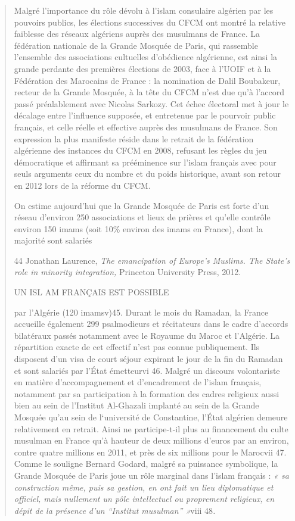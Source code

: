 \begin{quote}
Malgré l'importance du rôle dévolu à l'islam consulaire algérien par les
pouvoirs publics, les élections successives du CFCM ont montré la
relative faiblesse des réseaux algériens auprès des musulmans de France.
La fédération nationale de la Grande Mosquée de Paris, qui rassemble
l'ensemble des associations cultuelles d'obédience algérienne, est ainsi
la grande perdante des premières élections de 2003, face à l'UOIF et à
la Fédération des Marocains de France : la nomination de Dalil
Boubakeur, recteur de la Grande Mosquée, à la tête du CFCM n'est due
qu'à l'accord passé préalablement avec Nicolas Sarkozy. Cet échec
électoral met à jour le décalage entre l'influence supposée, et
entretenue par le pourvoir public français, et celle réelle et effective
auprès des musulmans de France. Son expression la plus manifeste réside
dans le retrait de la fédération algérienne des instances du CFCM en
2008, refusant les règles du jeu démocratique et affirmant sa
prééminence sur l'islam français avec pour seuls arguments ceux du
nombre et du poids historique, avant son retour en 2012 lors de la
réforme du CFCM.

On estime aujourd'hui que la Grande Mosquée de Paris est forte d'un
réseau d'environ 250 associations et lieux de prières et qu'elle
contrôle environ 150 imams (soit 10\% environ des imams en France), dont
la majorité sont salariés

44 Jonathan Laurence, \emph{The emancipation of Europe's Muslims. The
State's role in minority integration,} Princeton University Press, 2012.

UN ISL AM FRANÇAIS EST POSSIBLE

par l'Algérie (120 imamsv)45. Durant le mois du Ramadan, la France
accueille également 299 psalmodieurs et récitateurs dans le cadre
d'accords bilatéraux passés notamment avec le Royaume du Maroc et
l'Algérie. La répartition exacte de cet effectif n'est pas connue
publiquement. Ils disposent d'un visa de court séjour expirant le jour
de la fin du Ramadan et sont salariés par l'État émetteurvi 46. Malgré
un discours volontariste en matière d'accompagnement et d'encadrement de
l'islam français, notamment par sa participation à la formation des
cadres religieux aussi bien au sein de l'Institut Al-Ghazali implanté au
sein de la Grande Mosquée qu'au sein de l`université de Constantine,
l'État algérien demeure relativement en retrait. Ainsi ne participe-t-il
plus au financement du culte musulman en France qu'à hauteur de deux
millions d'euros par an environ, contre quatre millions en 2011, et près
de six millions pour le Marocvii 47. Comme le souligne Bernard Godard,
malgré sa puissance symbolique, la Grande Mosquée de Paris joue un rôle
marginal dans l'islam français : \emph{« sa construction même, puis sa
gestion, en ont fait un lieu diplomatique et officiel, mais nullement un
pôle intellectuel ou proprement religieux, en dépit de la présence d'un
``Institut musulman'' »}viii 48\emph{.}
\end{quote}


